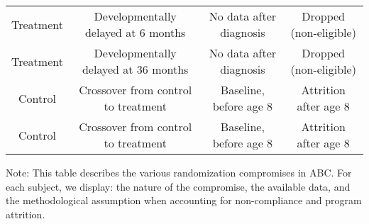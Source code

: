 \begin{sidewaystable}[H]
\begin{threeparttable}
\begin{tabular}{cccc}
 Treatment       & Developmentally delayed at 6 months & No data after diagnosis & Dropped (non-eligible) \\ 
Treatment       & Developmentally delayed at 36 months & No data after diagnosis & Dropped (non-eligible) \\ \midrule
Control       & Crossover from control to treatment & Baseline, before age 8 & Attrition after age 8 \\ 
Control       & Crossover from control to treatment & Baseline, before age 8 & Attrition after age 8   \\ \bottomrule
\end{tabular}
\begin{tablenotes}
\item Note: This table describes the various randomization compromises in ABC. For each subject, we display: the nature of the compromise, the available data, and the methodological assumption when accounting for non-compliance and program attrition. 
\end{tablenotes}
\end{threeparttable}
\end{sidewaystable}